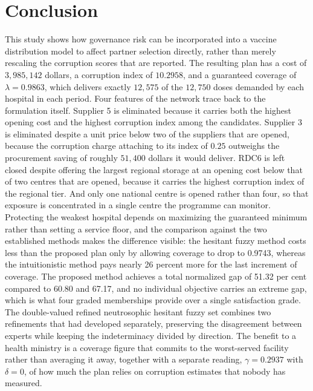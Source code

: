 \documentclass[a4paper]{elsarticle}
\begin{document}
{\section{Conclusion}
This study shows how governance risk can be incorporated into a vaccine distribution model to affect partner selection directly, rather than merely rescaling the corruption scores that are reported. The resulting plan has a cost of $3,985,142$ dollars, a corruption index of $10.2958$, and a guaranteed coverage of $\lambda= 0.9863$, which delivers exactly $12,575$ of the $12,750$ doses demanded by each hospital in each period. Four features of the network trace back to the formulation itself. Supplier 5 is eliminated because it carries both the highest opening cost and the highest corruption index among the candidates. Supplier 3 is eliminated despite a unit price below two of the suppliers that are opened, because the corruption charge attaching to its index of $0.25$ outweighs the procurement saving of roughly $51,400$ dollars it would deliver. RDC6 is left closed despite offering the largest regional storage at an opening cost below that of two centres that are opened, because it carries the highest corruption index of the regional tier. And only one national centre is opened rather than four, so that exposure is concentrated in a single centre the programme can monitor. Protecting the weakest hospital depends on maximizing the guaranteed minimum rather than setting a service floor, and the comparison against the two established methods makes the difference visible: the hesitant fuzzy method costs less than the proposed plan only by allowing coverage to drop to 0.9743, whereas the intuitionistic method pays nearly 26 percent more for the last increment of coverage. The proposed method achieves a total normalized gap of 51.32 per cent compared to 60.80 and 67.17, and no individual objective carries an extreme gap, which is what four graded memberships provide over a single satisfaction grade. The double-valued refined neutrosophic hesitant fuzzy set combines two refinements that had developed separately, preserving the disagreement between experts while keeping the indeterminacy divided by direction. The benefit to a health ministry is a coverage figure that commits to the worst-served facility rather than averaging it away, together with a separate reading, $\gamma = 0.2937$ with $\delta=0$, of how much the plan relies on corruption estimates that nobody has measured. \\
}
\end{document}

